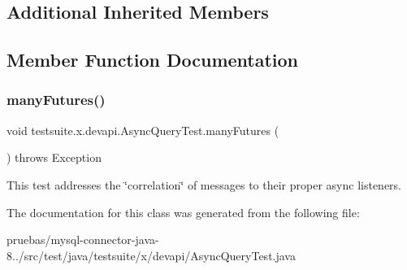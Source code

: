 \subsection*{Additional Inherited Members}


\subsection{Member Function Documentation}
\mbox{\label{classtestsuite_1_1x_1_1devapi_1_1_async_query_test_a68e3c2c8167c2bad493dd7a66f624080}} 
\subsubsection{\texorpdfstring{many\+Futures()}{manyFutures()}}
{\footnotesize\ttfamily void testsuite.\+x.\+devapi.\+Async\+Query\+Test.\+many\+Futures (\begin{DoxyParamCaption}{ }\end{DoxyParamCaption}) throws Exception}

This test addresses the \char`\"{}correlation\char`\"{} of messages to their proper async listeners. 

The documentation for this class was generated from the following file\+:\begin{DoxyCompactItemize}
\item 
pruebas/mysql-\/connector-\/java-\/8../src/test/java/testsuite/x/devapi/Async\+Query\+Test.\+java\end{DoxyCompactItemize}
